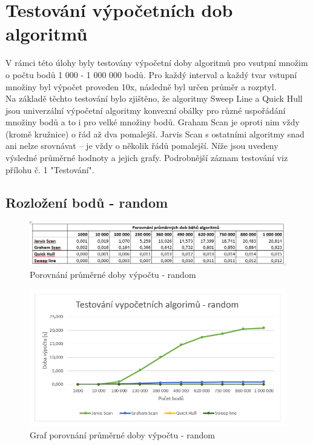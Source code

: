 \documentclass[a4paper, 12pt]{article}
\begin{document}
\clearpage

\section{Testování výpočetních dob algoritmů}
V rámci této úlohy byly testovány výpočetní doby algoritmů pro vsutpní množim o počtu bodů 1 000 - 1 000 000 bodů. Pro každý interval a každý tvar vstupní množiny byl výpočet proveden 10x, následně byl určen průměr a rozptyl. \\
Na základě těchto testování bylo zjištěno, že algoritmy Sweep Line a Quick Hull jsou univerzální výpočetní algoritmy konvexní obálky pro různé uspořádání množiny bodů a to i pro velké množiny bodů. Graham Scan je oproti nim vždy (kromě kružnice) o řád až dva pomalejší. Jarvis Scan s ostatními algoritmy snad ani nelze srovnávat – je vždy o několik řádů pomalejší. 
Níže jsou uvedeny výsledné průměrné hodnoty a jejich grafy. Podrobnější záznam testování viz přílohu č. 1 "Testování".

\vspace{1.5cm}
\subsection {Rozložení bodů - random}
\begin{figure}[h!]
	\centering
	\includegraphics[width=15cm]{random.jpg}
	\caption{Porovnání průměrné doby výpočtu - random}
\end{figure}


\begin{figure}[h!]
	\centering
	\includegraphics[width=12cm]{g1_random.jpg}
	\caption{Graf porovnání průměrné doby výpočtu - random}
\end{figure}
\clearpage
\end{document}
